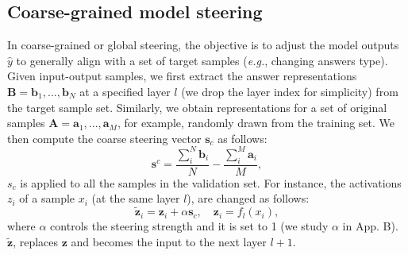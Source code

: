 \begin{table}[h]
    \centering
    \small
        \caption{\textbf{Steering MLLMs answers type.} Number of target answers type increases significantly after steering the model with the corresponding steering vector.}
    \label{tab:model_steering_answer_type}
\end{table}

\subsection{Coarse-grained model steering} 
\label{sec:model_steering_coarse_steering}
In coarse-grained or global steering, the objective is to adjust the model outputs $\hat{y}$ to generally align with a set of target samples (\emph{e.g.}, changing answers type). Given input-output samples, we first extract the answer representations $\bm{B} = {\bm{b}_1, ..., \bm{b}_N}$ at a specified layer $l$ (we drop the layer index for simplicity) from the target sample set. Similarly, we obtain representations for a set of original samples $\bm{A} = {\bm{a}_1, ..., \bm{a}_M}$, for example, randomly drawn from the training set. We then compute the coarse steering vector $\bm{s}_c$ as follows: 
\begin{equation} 
\label{eq:steering_vector_coarse}
\bm{s}^c = \frac{\sum_i^N \bm{b}_i}{N} - \frac{\sum_i^M \bm{a}_i}{M}, \end{equation}
$s_c$ is applied to all the samples in the validation set. For instance, the activations $z_i$ of a sample $x_i$ (at the same layer $l$), are changed as follows:
\begin{equation} 
\label{eq:steering_vector_coarse}
\tilde{\bm{z}}_i = \bm{z}_i + \alpha \bm{s}_c , \quad \bm{z}_i = f_l(x_i),
\end{equation}
where $\alpha$ controls the steering strength and it is set to 1 (we study $\alpha$ in App. B). $\tilde{\bm{z}}$, replaces $\bm{z}$ and becomes the input to the next layer $l+1$.

